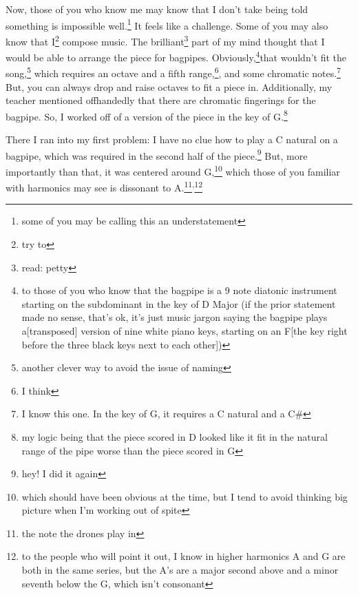 \documentclass[12pt]{article}[titlepage]
\newcommand{\1}{\={a}}
\newcommand{\2}{\={e}}
\newcommand{\3}{\={\i}}
\newcommand{\4}{\=o}
\newcommand{\5}{\=u}
\newcommand{\6}{\={A}}
\renewcommand{\,}{\textsuperscript{,}}
\begin{document}
Now, those of you who know me may know that I don't take being told something is impossible well.\footnote{some of you may be calling this an understatement}
It feels like a challenge.
Some of you may also know that I\footnote{try to} compose music.
The brilliant\footnote{read: petty} part of my mind thought that I would be able to arrange the piece for bagpipes.
Obviously,\footnote{to those of you who know that the bagpipe is a 9 note diatonic instrument starting on the subdominant in the key of D Major (if the prior statement made no sense, that's ok, it's just music jargon saying the bagpipe plays a[transposed] version of nine white piano keys, starting on an F[the key right before the three black keys next to each other])}that wouldn't fit the song,\footnote{another clever way to avoid the issue of naming} which requires an octave and a fifth range,\footnote{I think}, and some chromatic notes.\footnote{I know this one. In the key of G, it requires a C natural and a C\#}
But, you can always drop and raise octaves to fit a piece in.
Additionally, my teacher mentioned offhandedly that there are chromatic fingerings for the bagpipe.
So, I worked off of a version of the piece in the key of G.\footnote{my logic being that the piece scored in D looked like it fit in the natural range of the pipe worse than the piece scored in G}

There I ran into my first problem: I have no clue how to play a C natural on a bagpipe, which was required in the second half of the piece.\footnote{hey! I did it again}
But, more importantly than that, it was centered around G,\footnote{which should have been obvious at the time, but I tend to avoid thinking big picture when I'm working out of spite} which those of you familiar with harmonics may see is dissonant to A.\footnote{the note the drones play in}\,\footnote{to the people who will point it out, I know in higher harmonics A and G are both in the same series, but the A's are a major second above and a minor seventh below the G, which isn't consonant}
\end{document}
